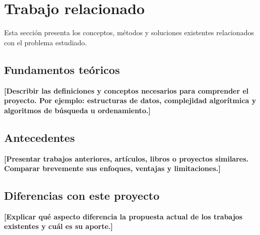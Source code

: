 \section{Trabajo relacionado}
\label{sec:trabajo-relacionado}

Esta sección presenta los conceptos, métodos y soluciones existentes
relacionados con el problema estudiado.

\subsection{Fundamentos teóricos}

\textbf{[Describir las definiciones y conceptos necesarios para comprender el
proyecto. Por ejemplo: estructuras de datos, complejidad algorítmica y
algoritmos de búsqueda u ordenamiento.]}

\subsection{Antecedentes}

\textbf{[Presentar trabajos anteriores, artículos, libros o proyectos
similares. Comparar brevemente sus enfoques, ventajas y limitaciones.]}

\subsection{Diferencias con este proyecto}

\textbf{[Explicar qué aspecto diferencia la propuesta actual de los trabajos
existentes y cuál es su aporte.]}
